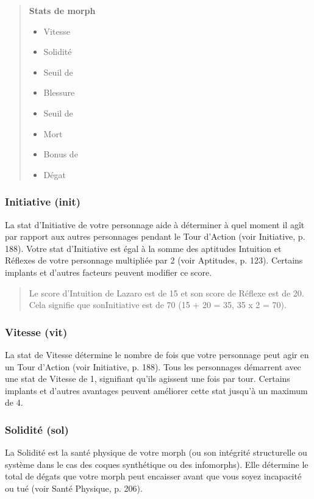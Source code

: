 \begin{quotation} \textbf{Stats de morph} \begin{itemize} \item Vitesse \item Solidité \item Seuil de \item Blessure \item Seuil de \item Mort \item Bonus de \item Dégat \end{itemize} \end{quotation} 

\subsubsection{Initiative (init)} \label{sec:initiative-init} 

La stat d'Initiative de votre personnage aide à déterminer à quel moment il agît par rapport aux autres personnages pendant le Tour d'Action (voir Initiative, p. 188). Votre stat d'Initiative est égal à la somme des aptitudes Intuition et Réflexes de votre personnage multipliée par 2 (voir Aptitudes, p. 123). Certains implants et d'autres facteurs peuvent modifier ce score. 

\begin{quotation} Le score d'Intuition de Lazaro est de 15 et son score de Réflexe est de 20. Cela signifie que sonInitiative est de 70 (15 + 20 = 35, 35 x 2 = 70). \end{quotation} 

\subsubsection{Vitesse (vit)} \label{sec:speed-spd} 

La stat de Vitesse détermine le nombre de fois que votre personnage peut agir en un Tour d'Action (voir Initiative, p. 188). Tous les personnages démarrent avec une stat de Vitesse de 1, signifiant qu'ils agissent une fois par tour. Certains implants et d'autres avantages peuvent améliorer cette stat jusqu'à un maximum de 4. 

\subsubsection{Solidité (sol)} \label{sec:durability-dur} 

La Solidité est la santé physique de votre morph (ou son intégrité structurelle ou système dans le cas des coques synthétique ou des infomorphs). Elle détermine le total de dégats que votre morph peut encaisser avant que vous soyez incapacité ou tué (voir Santé Physique, p. 206). 

